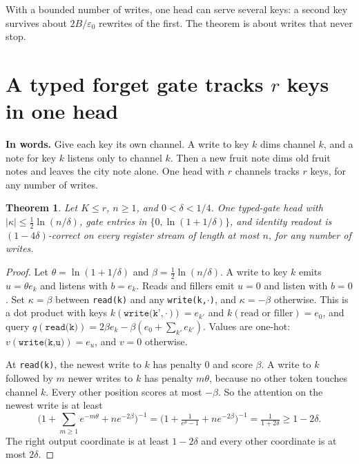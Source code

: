 \documentclass[10pt]{article}
\newtheorem{theorem}{Theorem}
\theoremstyle{definition}
\theoremstyle{remark}
\newcommand{\inwords}[1]{\par\smallskip\noindent\textbf{In words.} #1\par\smallskip}
\begin{document}
With a bounded number of writes, one head can serve several keys: a second key survives about $2B/\varepsilon_0$ rewrites of the first. The theorem is about writes that never stop.

\section{A typed forget gate tracks $r$ keys in one head}\label{sec:typed}

\inwords{Give each key its own channel. A write to key $k$ dims channel $k$, and a note for key $k$ listens only to channel $k$. Then a new fruit note dims old fruit notes and leaves the city note alone. One head with $r$ channels tracks $r$ keys, for any number of writes.}

\begin{theorem}\label{thm:typed}
Let $K \le r$, $n \ge 1$, and $0 < \delta < 1/4$. One typed-gate head with $|\kappa| \le \frac12 \ln(n/\delta)$, gate entries in $\{0, \ln(1 + 1/\delta)\}$, and identity readout is $(1 - 4\delta)$-correct on every register stream of length at most $n$, for any number of writes.
\end{theorem}

\begin{proof}
Let $\theta = \ln(1 + 1/\delta)$ and $\beta = \frac12 \ln(n/\delta)$. A write to key $k$ emits $u = \theta e_k$ and listens with $b = e_k$. Reads and fillers emit $u = 0$ and listen with $b = 0$. Set $\kappa = \beta$ between \texttt{read(k)} and any \texttt{write(k,$\cdot$)}, and $\kappa = -\beta$ otherwise. This is a dot product with keys $k(\texttt{write(k',$\cdot$)}) = e_{k'}$ and $k(\text{read or filler}) = e_0$, and query $q(\texttt{read(k)}) = 2\beta e_k - \beta(e_0 + \sum_{k'} e_{k'})$. Values are one-hot: $v(\texttt{write(k,u)}) = e_u$, and $v = 0$ otherwise.

At \texttt{read(k)}, the newest write to $k$ has penalty $0$ and score $\beta$. A write to $k$ followed by $m$ newer writes to $k$ has penalty $m\theta$, because no other token touches channel $k$. Every other position scores at most $-\beta$. So the attention on the newest write is at least
\[
\Big(1 + \textstyle\sum_{m \ge 1} e^{-m\theta} + n e^{-2\beta}\Big)^{-1} = \big(1 + \tfrac{1}{e^\theta - 1} + n e^{-2\beta}\big)^{-1} = \tfrac{1}{1 + 2\delta} \ge 1 - 2\delta.
\]
The right output coordinate is at least $1 - 2\delta$ and every other coordinate is at most $2\delta$.
\end{proof}
\end{document}
